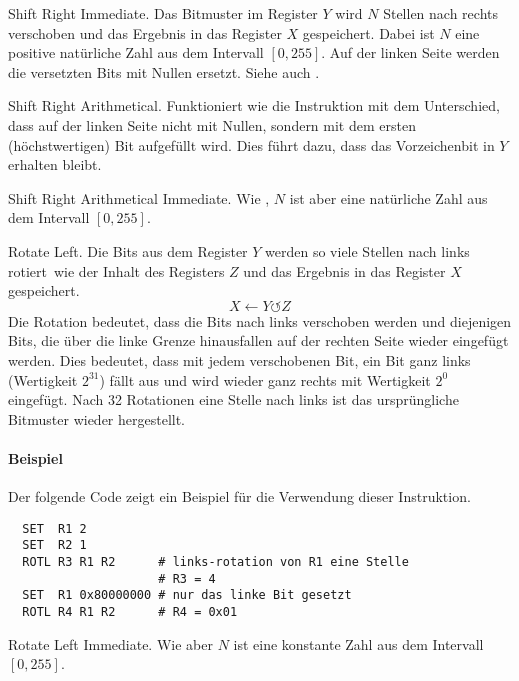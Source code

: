 \glqq Shift Right Immediate\grqq.
Das Bitmuster im Register $Y$ wird $N$ Stellen nach rechts verschoben und das
Ergebnis in das Register $X$ gespeichert.
Dabei ist $N$ eine positive natürliche Zahl aus dem Intervall $[0, 255]$.
Auf der linken Seite werden die versetzten Bits mit Nullen ersetzt.
Siehe auch .



\glqq Shift Right Arithmetical\grqq.
Funktioniert wie die Instruktion  mit dem Unterschied, dass auf der
linken Seite nicht mit Nullen, sondern mit dem ersten (höchstwertigen) Bit
aufgefüllt wird. Dies führt dazu, dass das Vorzeichenbit in $Y$ erhalten
bleibt.


\glqq Shift Right Arithmetical Immediate\grqq.
Wie , $N$ ist aber eine natürliche Zahl aus dem Intervall
$[0, 255]$.



\glqq Rotate Left\grqq.
Die Bits aus dem Register $Y$ werden so viele Stellen nach links \glqq
rotiert\grqq\ wie der Inhalt des Registers $Z$ und das Ergebnis in das Register
$X$ gespeichert.
\[
    X \gets Y \circlearrowleft Z
\]
Die Rotation bedeutet, dass die Bits nach links verschoben
werden und diejenigen Bits, die über die linke Grenze hinausfallen auf der
rechten Seite wieder eingefügt werden. 
Dies bedeutet, dass mit jedem verschobenen Bit, ein Bit ganz links (Wertigkeit
$2^{31}$) fällt aus und wird wieder ganz rechts mit Wertigkeit $2^{0}$ eingefügt.
Nach 32 Rotationen eine Stelle nach links ist das ursprüngliche Bitmuster
wieder hergestellt.

\paragraph{Beispiel}
Der folgende Code zeigt ein Beispiel für die Verwendung dieser Instruktion.
\begin{lstlisting}
  SET  R1 2
  SET  R2 1
  ROTL R3 R1 R2      # links-rotation von R1 eine Stelle
                     # R3 = 4
  SET  R1 0x80000000 # nur das linke Bit gesetzt
  ROTL R4 R1 R2      # R4 = 0x01
\end{lstlisting}


\glqq Rotate Left Immediate\grqq.
Wie  aber $N$ ist eine konstante Zahl aus dem Intervall $[0, 255]$.

